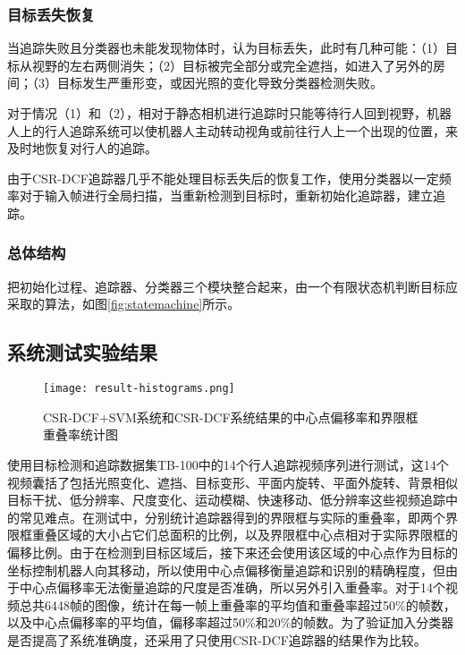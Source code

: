 \subsubsection{目标丢失恢复}

  当追踪失败且分类器也未能发现物体时，认为目标丢失，此时有几种可能：（1）目标从视野的左右两侧消失；（2）目标被完全部分或完全遮挡，如进入了另外的房间；（3）目标发生严重形变，或因光照的变化导致分类器检测失败。

  对于情况（1）和（2），相对于静态相机进行追踪时只能等待行人回到视野，机器人上的行人追踪系统可以使机器人主动转动视角或前往行人上一个出现的位置，来及时地恢复对行人的追踪。

  由于CSR-DCF追踪器几乎不能处理目标丢失后的恢复工作，使用分类器以一定频率对于输入帧进行全局扫描，当重新检测到目标时，重新初始化追踪器，建立追踪。


\subsubsection{总体结构}
  把初始化过程、追踪器、分类器三个模块整合起来，由一个有限状态机判断目标应采取的算法，如图\ref{fig:statemachine}所示。



\subsection{系统测试实验结果}

\begin{figure}[htb]
  \centering
  \texttt{[image: result-histograms.png]}
  \caption{CSR-DCF+SVM系统和CSR-DCF系统结果的中心点偏移率和界限框重叠率统计图}
  \label{fig:resulthistogram}
\end{figure}

  使用目标检测和追踪数据集TB-100\cite{Wu2015Object}中的14个行人追踪视频序列进行测试，这14个视频囊括了包括光照变化、遮挡、目标变形、平面内旋转、平面外旋转、背景相似目标干扰、低分辨率、尺度变化、运动模糊、快速移动、低分辨率这些视频追踪中的常见难点。在测试中，分别统计追踪器得到的界限框与实际的重叠率，即两个界限框重叠区域的大小占它们总面积的比例，以及界限框中心点相对于实际界限框的偏移比例。由于在检测到目标区域后，接下来还会使用该区域的中心点作为目标的坐标控制机器人向其移动，所以使用中心点偏移衡量追踪和识别的精确程度，但由于中心点偏移率无法衡量追踪的尺度是否准确，所以另外引入重叠率。对于14个视频总共6448帧的图像，统计在每一帧上重叠率的平均值和重叠率超过50\%的帧数，以及中心点偏移率的平均值，偏移率超过50\%和20\%的帧数。为了验证加入分类器是否提高了系统准确度，还采用了只使用CSR-DCF追踪器的结果作为比较。

